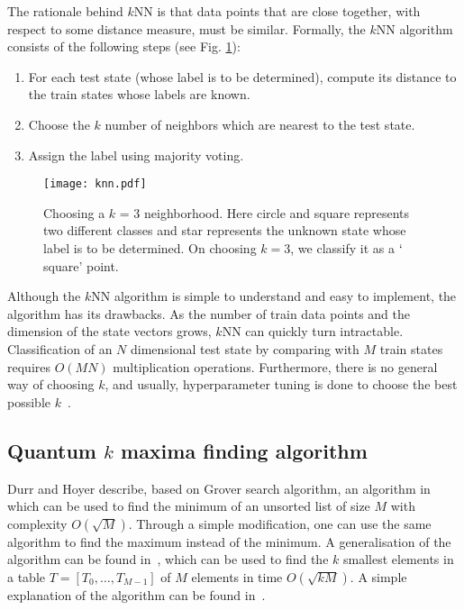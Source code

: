 \documentclass[a4paper,twocolumn,11pt,unpublished]{quantumarticle}
\begin{document}
        The rationale behind $k$NN is that data points that are close together, with respect to some distance measure, must be similar. Formally, the $k$NN algorithm consists of the following steps (see Fig. \ref{fig:knn}):
        \begin{enumerate}
             \item For each test state (whose label is to be determined), compute its distance to the train states whose labels are known.
             \item Choose the $k$ number of neighbors which are nearest to the test state.
             \item Assign the label using majority voting. 
        \end{enumerate}
        
        \begin{figure}
             \begin{center}
                 \texttt{[image: knn.pdf]}
                 \caption{Choosing a $k$ = 3 neighborhood. Here circle and square represents two different classes and star represents the unknown state whose label is to be determined. On choosing $k=3$, we classify it as a $\lq$square' point.}
                 \label{fig:knn}
             \end{center}
         \end{figure}
        
        
         Although the $k$NN algorithm is simple to understand and easy to implement, the algorithm has its drawbacks. As the number of train data points and the dimension of the state vectors grows, $k$NN can quickly turn intractable. Classification of an $N$ dimensional test state by comparing with $M$ train states requires $O(MN)$ multiplication operations. Furthermore, there is no general way of choosing $k$, and usually, hyperparameter tuning is done to choose the best possible $k$~\cite{Samworth2012}.
    


    
        \subsection{Quantum $k$ maxima finding algorithm}
        
        Durr and Hoyer describe, based on Grover search algorithm, an algorithm in \cite{Durr1996} which can be used to find the minimum of an unsorted list of size $M$ with complexity $O(\sqrt M)$. Through a simple modification, one can use the same algorithm to find the maximum instead of the minimum.  A generalisation of the algorithm can be found in~\cite{Durr2006}, which can be used to find the $k$ smallest elements in a table $T = [T_0,\ldots, T_{M-1}]$ of $M$ elements in time $O(\sqrt{kM})$. A simple explanation of the algorithm can be found in~\cite{Miyamoto2019}. 
        
\end{document}
